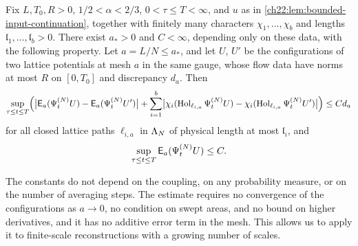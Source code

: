 \begin{theorem}\label{ch26:thm:bounded-input-energy-loop-stability}
Fix $L,T_0,R>0$, $1/2<\alpha<2/3$, $0<\tau\le T<\infty$, and $u$ as in \cref{ch22:lem:bounded-input-continuation}, together with finitely many characters $\chi_1,\dots,\chi_b$ and lengths $\mathfrak l_1,\dots,\mathfrak l_b>0$. There exist $a_*>0$ and $C<\infty$, depending only on these data, with the following property. Let $a=L/N\le a_*$, and let $U$, $U'$ be the configurations of two lattice potentials at mesh $a$ in the same gauge, whose flow data have norms at most $R$ on $[0,T_0]$ and discrepancy $d_a$. Then
\begin{equation}\label{ch26:eq:bounded-input-energy-loop-stability}
 \sup_{\tau\le t\le T}\Bigl(\bigl\lvert\mathsf E_a(\Psi^{(N)}_tU)-\mathsf E_a(\Psi^{(N)}_tU')\bigr\rvert+\sum_{i=1}^b\bigl\lvert\chi_i(\operatorname{Hol}_{\ell_{i,a}}\Psi^{(N)}_tU)-\chi_i(\operatorname{Hol}_{\ell_{i,a}}\Psi^{(N)}_tU')\bigr\rvert\Bigr)\le Cd_a
\end{equation}
for all closed lattice paths $\ell_{i,a}$ in $\Lambda_{N}$ of physical length at most $\mathfrak l_i$, and
\[
 \sup_{\tau\le t\le T}\mathsf E_a(\Psi^{(N)}_tU)\le C .
\]
\end{theorem}

The constants do not depend on the coupling, on any probability measure, or on the number of averaging steps. The estimate requires no convergence of the configurations as $a\to0$, no condition on swept areas, and no bound on higher derivatives, and it has no additive error term in the mesh. This allows us to apply it to finite-scale reconstructions with a growing number of scales.

